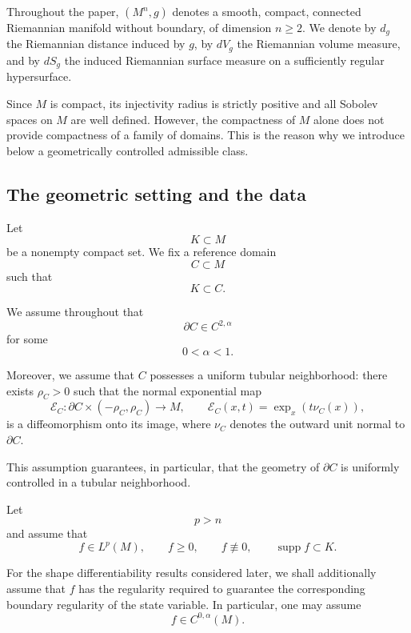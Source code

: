 \documentclass{article}
\begin{document}
Throughout the paper, $(M^n,g)$ denotes a smooth, compact, connected
Riemannian manifold without boundary, of dimension $n\geq 2$. We denote
by $d_g$ the Riemannian distance induced by $g$, by $dV_g$ the Riemannian
volume measure, and by $dS_g$ the induced Riemannian surface measure on
a sufficiently regular hypersurface.

Since $M$ is compact, its injectivity radius is strictly positive and
all Sobolev spaces on $M$ are well defined. However, the compactness of
$M$ alone does not provide compactness of a family of domains. This is
the reason why we introduce below a geometrically controlled admissible
class.

\subsection{The geometric setting and the data}
\label{subsec:geometric-setting}

Let
\[
K\subset M
\]
be a nonempty compact set. We fix a reference domain
\[
C\subset M
\]
such that
\begin{equation}
K\subset C.
\label{eq:K-compact-C}
\end{equation}

We assume throughout that
\[
\partial C\in C^{2,\alpha}
\]
for some
\[
0<\alpha<1.
\]

Moreover, we assume that $C$ possesses a uniform tubular neighborhood:
there exists $\rho_C>0$ such that the normal exponential map
\begin{equation}
\mathcal E_C:
\partial C\times(-\rho_C,\rho_C)
\longrightarrow M,
\qquad
\mathcal E_C(x,t)
=
\exp_x(t\nu_C(x)),
\label{eq:normal-exp-C}
\end{equation}
is a diffeomorphism onto its image, where $\nu_C$ denotes the outward
unit normal to $\partial C$.

This assumption guarantees, in particular, that the geometry of
$\partial C$ is uniformly controlled in a tubular neighborhood.

Let
\[
p>n
\]
and assume that
\begin{equation}
f\in L^p(M),
\qquad
f\geq0,
\qquad
f\not\equiv0,
\qquad
\operatorname{supp}f\subset K.
\label{eq:f-assumptions}
\end{equation}

For the shape differentiability results considered later, we shall
additionally assume that $f$ has the regularity required to guarantee
the corresponding boundary regularity of the state variable. In
particular, one may assume
\begin{equation}
f\in C^{0,\alpha}(M).
\label{eq:f-holder}
\end{equation}
\end{document}
